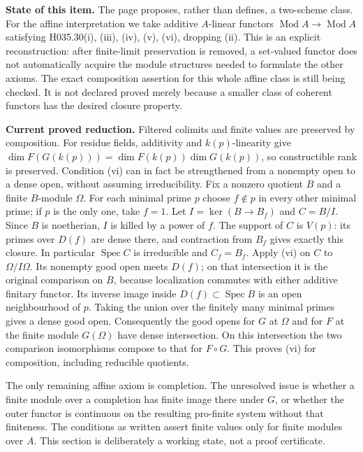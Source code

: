 \textbf{State of this item.} The page proposes, rather than defines,
a two-scheme class. For the affine interpretation we take additive
$A$-linear functors $\operatorname{Mod}A\to\operatorname{Mod}A$
satisfying H035.30(i), (iii), (iv), (v), (vi), dropping (ii).
This is an explicit reconstruction: after finite-limit preservation
is removed, a set-valued functor does not automatically acquire the
module structures needed to formulate the other axioms. The exact
composition assertion for this whole affine class is still being
checked. It is not declared proved merely because a smaller class
of coherent functors has the desired closure property.

\textbf{Current proved reduction.} Filtered colimits and finite values
are preserved by composition. For residue fields, additivity and
$k(p)$-linearity give
$\dim F(G(k(p)))=\dim F(k(p))\dim G(k(p))$, so constructible rank
is preserved. Condition (vi) can in fact be strengthened from a
nonempty open to a dense open, without assuming irreducibility.
Fix a nonzero quotient $B$ and a finite $B$-module $\Omega$.
For each minimal prime $p$ choose $f\notin p$ in every other
minimal prime; if $p$ is the only one, take $f=1$.
Let $I=\ker(B\to B_f)$ and $C=B/I$. Since $B$ is noetherian,
$I$ is killed by a power of $f$. The support of $C$ is $V(p)$:
its primes over $D(f)$ are dense there, and contraction from
$B_f$ gives exactly this closure. In particular $\operatorname{Spec}C$
is irreducible and $C_f=B_f$. Apply (vi) on $C$ to
$\Omega/I\Omega$. Its nonempty good open meets $D(f)$;
on that intersection it is the original comparison on $B$,
because localization commutes with either additive finitary functor.
Its inverse image inside $D(f)\subset\operatorname{Spec}B$
is an open neighbourhood of $p$. Taking the union over the finitely
many minimal primes gives a dense good open. Consequently the good
opens for $G$ at $\Omega$ and for $F$ at the finite module
$G(\Omega)$ have dense intersection. On this intersection the two
comparison isomorphisms compose to that for $F\circ G$.
This proves (vi) for composition, including reducible quotients.

The only remaining affine axiom is completion. The unresolved issue is
whether a finite module over a completion has finite image there
under $G$, or whether the outer functor is continuous on the
resulting pro-finite system without that finiteness. The conditions
as written assert finite values only for finite modules over $A$.
This section is deliberately a working state, not a proof certificate.

